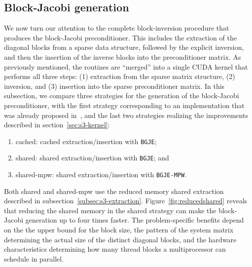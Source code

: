 \subsection{Block-Jacobi generation}


We now turn our attention to the complete block-inversion procedure that
produces the block-Jacobi preconditioner. This includes the extraction of the
diagonal blocks from a sparse data structure, followed by the explicit
inversion, and then the insertion of the inverse blocks into the preconditioner
matrix. As previously mentioned, the routines are ``merged'' into a single CUDA
kernel that performs all three steps: (1) extraction from the sparse matrix
structure, (2) inversion, and (3) insertion into the sparse preconditioner matrix. In
this subsection, we compare three strategies for the generation of the
block-Jacobi preconditioner, with the first strategy corresponding to an
implementation that was already proposed
in~\cite{Anzt:2017:BGE:3026937.3026940}, and the last two strategies realizing the
improvements described in section~\ref{sec:s3-kernel}:
\begin{enumerate}
    \item {\sc cached}: cached extraction/insertion with {\tt BGJE};
    \item {\sc shared}: shared extraction/insertion with {\tt BGJE}; and
    \item {\sc shared-mpw}: shared extraction/insertion with {\tt BGJE-MPW}.
\end{enumerate}
Both {\sc shared} and {\sc shared-mpw} use the reduced memory shared extraction
described in subsection~\ref{subsec:s3-extraction}.  
{
Figure~\ref{fig:reducedshared} reveals that reducing the shared memory in the 
{\sc shared} strategy can make the block-Jacobi generation up to four times 
faster. The problem-specific benefits depend on the the upper bound for the 
block size, the pattern of the system matrix determining the actual size of the 
distinct diagonal blocks, and the hardware characteristics determining how many 
thread blocks a multiprocessor can schedule in parallel.}



